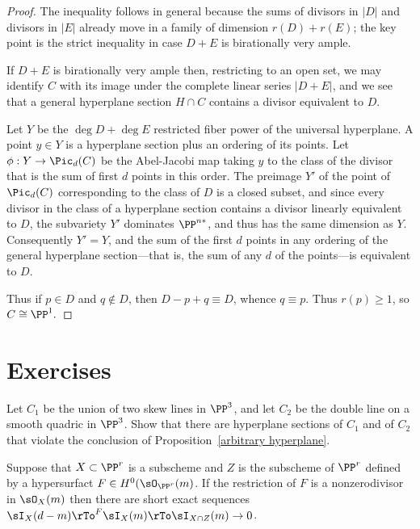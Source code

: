 \begin{proof}
 The inequality follows in general because the sums of divisors in $|D|$ and divisors in $|E|$ already move in 
 a family of dimension $r(D)+r(E)$; the key point is the strict inequality in case $D+E$ is birationally very ample.
 
If $D+E$ is birationally very ample then, restricting to an open set,
we may identify $C$ with its image under the complete linear series $|D+E|$, and we see that a general hyperplane section $H\cap C$ contains a divisor equivalent to $D$.

Let $Y$ be the $\deg D +\deg E$ restricted fiber power of the universal hyperplane.
A point $y\in Y$ is a hyperplane section plus an ordering of its points.  Let $\phi: Y \to \Pic_d(C)$ be the Abel-Jacobi map taking $y$
 to the class of the divisor that is the sum of first $d$ points in this order. The preimage  $Y'$ of the point of $\Pic_d(C)$ corresponding to the class of $D$ is a closed subset, and
since every divisor in the class of a hyperplane section contains a divisor
linearly equivalent to  $D$, the subvariety $Y'$ dominates $\PP^{n*}$, and thus
has the same dimension as $Y$. Consequently $Y'=Y$, and the sum of the first $d$ points
in any ordering of the general hyperplane section---that is, the sum of any $d$
of the points---is equivalent to $D$.

Thus if $p\in D$ and $q\notin D$, then $D-p+q \equiv D$, whence $q\equiv p$. Thus
$r(p)\geq 1$, so $C\cong \PP^1.$
\end{proof}



\section{Exercises}
\begin{exercise}\label{arbitrary hyperplane examples}
Let $C_1$ be the union of two skew lines in $\PP^3$, and let $C_2$ be the double line on a smooth quadric in $\PP^3$.
Show that there are hyperplane sections of $C_1$ and of $C_2$ that violate the conclusion of Proposition~\ref{arbitrary hyperplane}.
\end{exercise}


\begin{exercise}\label{restriction of ideals}
Suppose that $X\subset \PP^r$ is a subscheme and  $Z$ is the subscheme of $\PP^r$ defined by a hypersurfact $F\in H^0(\sO_{\PP^r}(m)$. If the restriction of $F$ is a nonzerodivisor in $\sO_X(m)$  then there are short exact sequences
$\sI_X(d-m) \rTo^F \sI_X(m) \rTo \sI_{X\cap Z}(m) \to 0$.
\end{exercise}

